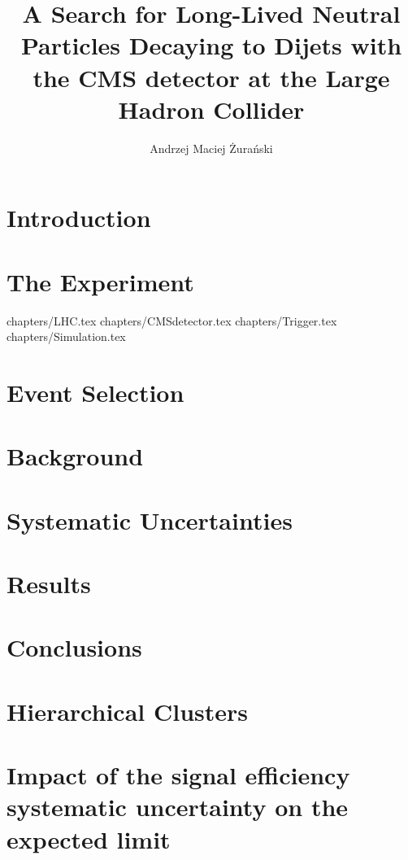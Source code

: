 \documentclass[phd,black]{PrincetonThesis}
\title{A Search for Long-Lived Neutral Particles Decaying to Dijets with the CMS detector at the
Large Hadron Collider}
\author{Andrzej Maciej \.Zura\'nski}
\begin{document}
\begin{frontmatter}
  \begin{thesisabstract}
    
  \end{thesisabstract}
  \begin{acknowledgements}
    
  \end{acknowledgements}
\end{frontmatter}


\chapter{Introduction}
\label{chap:intro}


\chapter{The Experiment}
\label{chap:cmslhc}
 {chapters/LHC.tex}
 {chapters/CMSdetector.tex}
 {chapters/Trigger.tex}
 {chapters/Simulation.tex}

\chapter{Event Selection}
\label{chap:selection}
% 
 

\chapter{Background}


\chapter{Systematic Uncertainties}


\chapter{Results}


\chapter{Conclusions}
%


\appendix
\chapter{Hierarchical Clusters}

\chapter{Impact of the signal efficiency systematic uncertainty on the expected limit}

\cleardoublepage 
\end{document}
